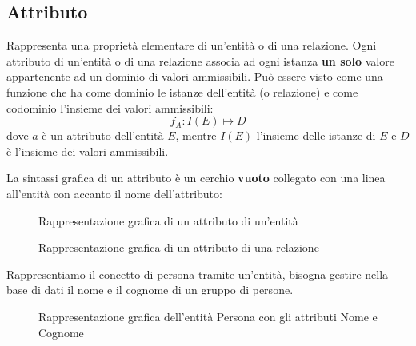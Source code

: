 \documentclass[a4paper,twoside]{article}
\begin{document}
\subsection{Attributo}
Rappresenta una proprietà elementare di un'entità o di una relazione.
Ogni attributo di un'entità o di una relazione associa ad ogni istanza \textbf{un solo}
valore appartenente ad un dominio di valori ammissibili. Può essere visto
come una funzione che ha come dominio le istanze dell'entità (o relazione) e come
codominio l'insieme dei valori ammissibili:
\[
  f_A: I(E) \mapsto D
\] 
dove \( a \) è un attributo dell'entità \( E \), mentre \( I(E) \) l'insieme delle
istanze di \( E \) e \( D \) è l'insieme dei valori ammissibili.

\vspace{1em}
\noindent
La sintassi grafica di un attributo è un cerchio \textbf{vuoto} collegato con una linea all'entità
con accanto il nome dell'attributo:
\begin{figure}[H]
  \centering
  \caption{Rappresentazione grafica di un attributo di un'entità}
\end{figure}

\begin{figure}[H]
  \centering
  \caption{Rappresentazione grafica di un attributo di una relazione}
\end{figure}

\begin{example}
  Rappresentiamo il concetto di persona tramite un'entità, bisogna gestire nella base
  di dati il nome e il cognome di un gruppo di persone.
  \begin{figure}[H]
    \centering
    \caption{Rappresentazione grafica dell'entità Persona con gli attributi Nome e Cognome}
  \end{figure}
\end{example}
\end{document}
